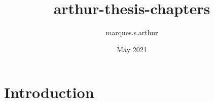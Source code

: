 \documentclass{article}
\title{arthur-thesis-chapters}
\author{marques.s.arthur }
\date{May 2021}
\begin{document}
\maketitle

\section{Introduction}
\end{document}
